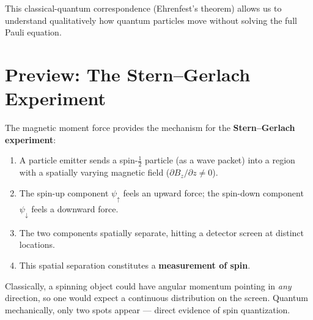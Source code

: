 \documentclass[11pt,a4paper]{article}
\theoremstyle{definition}
\theoremstyle{plain}
\theoremstyle{remark}
\begin{document}
This classical-quantum correspondence (Ehrenfest's theorem) allows us to understand qualitatively how quantum particles move without solving the full Pauli equation.

\section{Preview: The Stern--Gerlach Experiment}

The magnetic moment force provides the mechanism for the \textbf{Stern--Gerlach experiment}:

\begin{enumerate}
    \item A particle emitter sends a spin-$\frac{1}{2}$ particle (as a wave packet) into a region with a spatially varying magnetic field ($\partial B_z/\partial z \neq 0$).
    \item The spin-up component $\psi_\uparrow$ feels an upward force; the spin-down component $\psi_\downarrow$ feels a downward force.
    \item The two components spatially separate, hitting a detector screen at distinct locations.
    \item This spatial separation constitutes a \textbf{measurement of spin}.
\end{enumerate}

Classically, a spinning object could have angular momentum pointing in \emph{any} direction, so one would expect a continuous distribution on the screen. Quantum mechanically, only two spots appear --- direct evidence of spin quantization.
\end{document}
